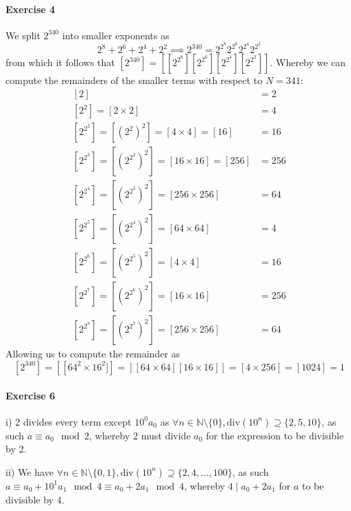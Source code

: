 \paragraph{Exercise 4}
We split $2^{340}$ into smaller exponents as
\[
    2^{8}+2^{6}+2^{4}+2^{2}\implies2^{340}=2^{2^{8}}2^{2^{6}}2^{2^{4}}2^{2^{2}}
\]
from which it follows that $\left[2^{340}\right]=\left[\left[2^{2^{8}}\right]\left[2^{2^{6}}\right]\left[2^{2^{4}}\right]\left[2^{2^{2}}\right]\right]$. Whereby we can compute the remainders of the smaller terms with respect to $N=341$:
\begin{align*}
    \left[2\right]&=2 \\
    \left[2^{2}\right]=[2\times 2]&=4 \\
    \left[2^{2^{2}}\right]=\left[\left(2^{2}\right)^{2}\right]=\left[4\times 4\right]=\left[16\right]&=16 \\
    \left[2^{2^{3}}\right]=\left[\left(2^{2^{2}}\right)^{2}\right]=\left[16\times 16\right]=\left[256\right]&=256 \\
    \left[2^{2^{4}}\right]=\left[\left(2^{2^{3}}\right)^{2}\right]=\left[256\times 256\right]&=64 \\
    \left[2^{2^{5}}\right]=\left[\left(2^{2^{4}}\right)^{2}\right]=\left[64\times 64\right]&=4 \\
    \left[2^{2^{6}}\right]=\left[\left(2^{2^{5}}\right)^{2}\right]=\left[4\times 4\right]&=16 \\
    \left[2^{2^{7}}\right]=\left[\left(2^{2^{6}}\right)^{2}\right]=\left[16\times 16\right]&=256 \\
    \left[2^{2^{8}}\right]=\left[\left(2^{2^{7}}\right)^{2}\right]=\left[256\times 256\right]&=64
\end{align*}
Allowing us to compute the remainder as
\[
    \left[2^{340}\right]=\left[\left[64^{2}\times 16^{2}]\right]=\left[\left[64\times64\right]\left[16\times16\right]\right]=\left[4\times 256\right]=\left[1024\right]=1
\]
\paragraph{Exercise 6}
i) 2 divides every term except $10^{0}a_{0}$ as $\forall n\in\mathbb{N}\setminus\{0\},\text{div}(10^{n})\supseteq\{2,5,10\}$, as such $a\equiv a_0\mod 2$, whereby 2 must divide $a_{0}$ for the expression to be divisible by 2.

ii) We have $\forall n\in\mathbb{N}\setminus\{0,1\},\text{div}(10^{n})\supseteq\{2,4,\ldots,100\}$, as such $a\equiv a_{0}+10^{1}a_{1}\mod 4\equiv a_{0}+2a_{1}\mod 4$, whereby $4\mid a_{0}+2a_{1}$ for $a$ to be divisible by 4.


